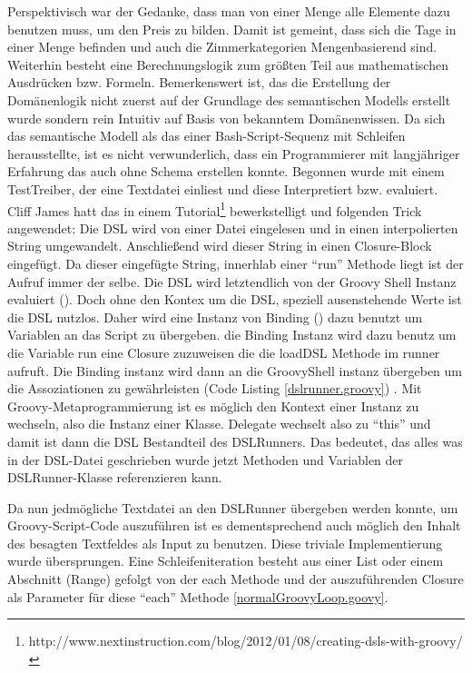 \documentclass[11pt,english,ngerman, headsepline]{scrreprt}
\begin{document}
Perspektivisch war der Gedanke, dass man von einer Menge alle Elemente dazu
benutzen muss, um den Preis zu bilden. Damit ist gemeint, dass sich die Tage in
einer Menge befinden und auch die Zimmerkategorien Mengenbasierend sind.
Weiterhin besteht eine Berechnungslogik zum größten Teil aus mathematischen
Ausdrücken bzw. Formeln.
Bemerkenswert ist, das die Erstellung der Domänenlogik nicht zuerst auf der
Grundlage des semantischen Modells erstellt wurde sondern rein Intuitiv auf
Basis von bekanntem Domänenwissen. Da sich das semantische Modell als das einer
Bash-Script-Sequenz mit Schleifen herausstellte, ist es nicht verwunderlich,
dass ein Programmierer mit langjähriger Erfahrung das auch ohne Schema erstellen
konnte.
Begonnen wurde mit einem TestTreiber, der eine Textdatei einliest und diese
Interpretiert bzw. evaluiert.
Cliff James hatt das in einem
Tutorial\footnote{http://www.nextinstruction.com/blog/2012/01/08/creating-dsls-with-groovy/}
bewerkstelligt und folgenden Trick angewendet:
Die DSL wird von einer Datei eingelesen und in einen interpolierten String
umgewandelt. Anschließend wird dieser String in einen Closure-Block eingefügt.
Da dieser eingefügte String, innerhlab einer ``run'' Methode liegt ist der
Aufruf immer der selbe.
Die DSL wird letztendlich von der Groovy Shell Instanz evaluiert (\cite[S.
368]{koenig2007groovy}). 
Doch ohne den Kontex um die DSL, speziell ausenstehende Werte ist die DSL nutzlos. Daher wird
eine Instanz von Binding (\cite[S. 368]{koenig2007groovy}) dazu benutzt um
Variablen an das Script zu übergeben.
die Binding Instanz wird dazu benutz um die Variable run eine Closure zuzuweisen
die die loadDSL Methode im runner aufruft. Die Binding instanz wird dann an
die GroovyShell instanz übergeben um die Assoziationen zu gewährleisten (Code
Listing \ref{dslrunner.groovy}) .
Mit Groovy-Metaprogrammierung ist es möglich den Kontext einer Instanz zu
wechseln, also die Instanz einer Klasse. Delegate wechselt also zu ``this'' und
damit ist dann die DSL Bestandteil des DSLRunners. Das bedeutet, das alles was
in der DSL-Datei geschrieben wurde jetzt Methoden und Variablen der
DSLRunner-Klasse referenzieren kann.
 


Da nun jedmögliche Textdatei an den DSLRunner übergeben werden konnte, um
Groovy-Script-Code auszuführen ist es dementsprechend auch möglich den Inhalt
des besagten Textfeldes als Input zu benutzen. Diese triviale Implementierung
wurde übersprungen. 
 Eine Schleifeniteration besteht aus einer List oder
einem Abschnitt (Range) gefolgt von der each Methode und der auszuführenden
Closure als Parameter für diese ``each'' Methode \ref{normalGroovyLoop.goovy}.
\end{document}
